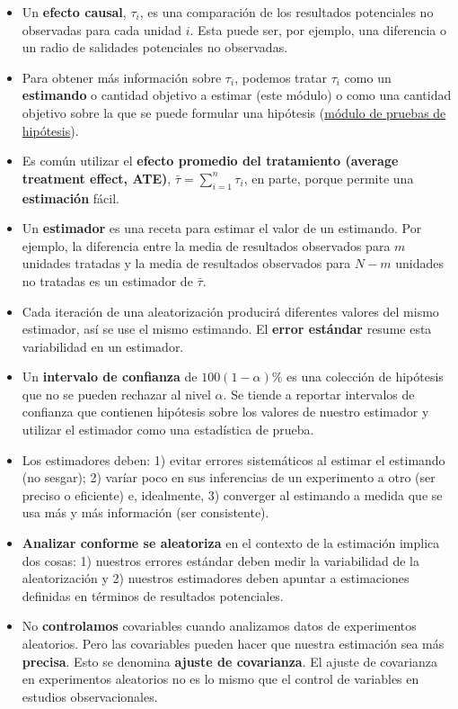 \documentclass[12pt,spanish,]{book}
\begin{document}
\begin{itemize}
\item
  Un \textbf{efecto causal}, \(\tau_i\), es una comparación de los resultados potenciales no observadas para cada unidad \(i\). Esta puede ser, por ejemplo, una diferencia o un radio de salidades potenciales no observadas.
\item
  Para obtener más información sobre \(\tau_i\), podemos tratar \(\tau_{i}\) como un \textbf{estimando} o cantidad objetivo a estimar (este módulo) o como una cantidad objetivo sobre la que se puede formular una hipótesis (\href{pruebas-de-hipótesis.html}{módulo de pruebas de hipótesis}).
\item
  Es común utilizar el \textbf{efecto promedio del tratamiento (average treatment effect, ATE)}, \(\bar{\tau} = \sum_ {i = 1}^n \tau_{i}\), en parte, porque permite una \textbf{estimación} fácil.
\item
  Un \textbf{estimador} es una receta para estimar el valor de un estimando. Por ejemplo, la diferencia entre la media de resultados observados para \(m\) unidades tratadas y la media de resultados observados para \(N-m\) unidades no tratadas es un estimador de \(\bar{\tau}\).
\item
  Cada iteración de una aleatorización producirá diferentes valores del mismo estimador, así se use el mismo estimando. El \textbf{error estándar} resume esta variabilidad en un estimador.
\item
  Un \textbf{intervalo de confianza} de \(100(1- \alpha)\)\% es una colección de hipótesis que no se pueden rechazar al nivel \(\alpha\). Se tiende a reportar intervalos de confianza que contienen hipótesis sobre los valores de nuestro estimador y utilizar el estimador como una estadística de prueba.
\item
  Los estimadores deben: 1) evitar errores sistemáticos al estimar el estimando (no sesgar); 2) varíar poco en sus inferencias de un experimento a otro (ser preciso o eficiente) e, idealmente, 3) converger al estimando a medida que se usa más y más información (ser consistente).
\item
  \textbf{Analizar conforme se aleatoriza} en el contexto de la estimación implica dos cosas: 1) nuestros errores estándar deben medir la variabilidad de la aleatorización y 2) nuestros estimadores deben apuntar a estimaciones definidas en términos de resultados potenciales.
\item
  No \textbf{controlamos} covariables cuando analizamos datos de experimentos aleatorios. Pero las covariables pueden hacer que nuestra estimación sea más \textbf{precisa}. Esto se denomina \textbf{ajuste de covarianza}. El ajuste de covarianza en experimentos aleatorios no es lo mismo que el control de variables en estudios observacionales.

\end{itemize}
\end{document}
